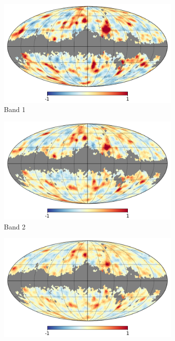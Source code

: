 \documentclass[openany,a4paper,12pt,oneside]{book}
\begin{document}
\begin{spacing}{1.5}
\begin{figure}[!htb]
     \centering
     \begin{subfigure}[b]{0.495\textwidth}
         \centering
         \includegraphics[width=\textwidth]{Imagens/band1_wmask_xsc.png}
         \caption{Band 1}
         \label{fig:contrast_map1}
     \end{subfigure}
     \hfill
     \begin{subfigure}[b]{0.495\textwidth}
         \centering
         \includegraphics[width=\textwidth]{Imagens/band2_wmask_xsc.png}
         \caption{Band 2}
         \label{fig:contrast_map2}
     \end{subfigure}
     \hfill
     \begin{subfigure}[b]{0.495\textwidth}
         \centering
         \includegraphics[width=\textwidth]{Imagens/band3_wmask_xsc.png}

\end{subfigure}
\end{figure}
\end{spacing}
\end{document}
